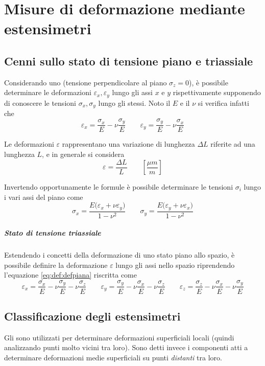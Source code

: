 \chapter{Misure di deformazione mediante estensimetri}

\section{Cenni sullo stato di tensione piano e triassiale}
	Considerando uno  (tensione perpendicolare al piano $\sigma_z=0$), è possibile determinare le deformazioni $\varepsilon_x, \varepsilon_y$ lungo gli assi $x$ e $y$ rispettivamente supponendo di conoscere le tensioni $\sigma_x,\sigma_y$ lungo gli stessi. Noto il  $E$ e il  $\nu$ si verifica infatti che
	\begin{equation} \label{eq:def:defpiana}
		\varepsilon_x = \frac{\sigma_x}{E} - \nu \frac{\sigma_y}{E} \qquad \varepsilon_y = \frac{\sigma_y}{E} - \nu \frac{\sigma_x}{E}
	\end{equation}
	
	Le deformazioni $\varepsilon$ rappresentano una variazione di lunghezza $\Delta L$ riferite ad una lunghezza $L$, e in generale si considera
	\[ \varepsilon = \frac{\Delta L}{L} \qquad \left[\frac {\mu m} m \right]\]
	
	Invertendo opportunamente le formule è possibile determinare le tensioni $\sigma_i$ lungo i vari assi del piano come
	\[ \sigma_x = \frac{E \big(\varepsilon_x + \nu \varepsilon_y \big)}{1-\nu^2} \qquad \sigma_y = \frac{E \big(\varepsilon_y + \nu \varepsilon_x \big)}{1-\nu^2} \]
	
	\paragraph{Stato di tensione triassiale} Estendendo i concetti della deformazione di uno stato piano allo spazio, è possibile definire la deformazione $\varepsilon$ lungo gli assi nello spazio riprendendo l'equazione \ref{eq:def:defpiana} riscritta come
	\begin{equation}
		\varepsilon_x = \frac{\sigma_x}{E} - \nu \frac{\sigma_y}{E} - \nu \frac{\sigma_z}{E} \qquad \varepsilon_y = \frac{\sigma_y}{E} - \nu \frac{\sigma_x}{E} - \nu \frac{\sigma_z}{E} \qquad \varepsilon_z = \frac{\sigma_z}{E} - \nu \frac{\sigma_x}{E} - \nu \frac{\sigma_y}{E}
	\end{equation}

\section{Classificazione degli estensimetri}
	Gli  sono utilizzati per determinare deformazioni superficiali locali (quindi analizzando punti molto vicini tra loro). Sono detti invece  i componenti atti a determinare deformazioni medie superficiali su punti \textit{distanti} tra loro.
	
